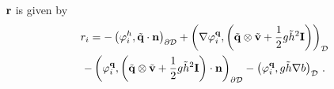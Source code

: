 $\mathbf{r}$ is given by
\begin{multline}
  r_i =
  - \left(\varphi_i^h,\tilde{\mathbf{q}}\cdot\mathbf{n}
    \right)_{\partial\mathcal{D}}
  + \left(\nabla\varphi_i^{\mathbf{q}},
    \left(\tilde{\mathbf{q}}\otimes\tilde{\mathbf{v}}
    + \frac{1}{2}g\tilde{h}^2\mathbf{I}\right)\right)_{\mathcal{D}}
  \\- \left(\varphi_i^{\mathbf{q}},
    \left(\tilde{\mathbf{q}}\otimes\tilde{\mathbf{v}}
    + \frac{1}{2}g \tilde{h}^2\mathbf{I}\right)\cdot\mathbf{n}
    \right)_{\partial\mathcal{D}}
  - \left(\varphi_i^{\mathbf{q}},
    g\tilde{h}\nabla b\right)_{\mathcal{D}} \,.
\end{multline}
